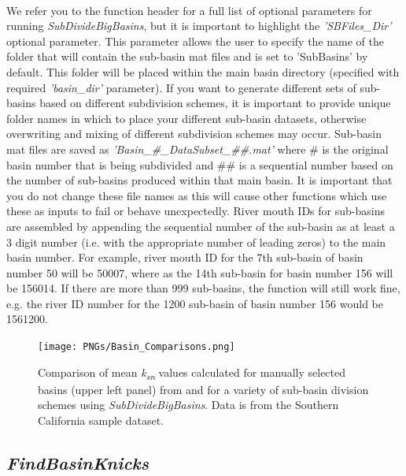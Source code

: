 \paragraph{}We refer you to the function header for a full list of optional parameters for running \textit{SubDivideBigBasins}, but it is important to highlight the \textit{'SBFiles\_Dir'} optional parameter. This parameter allows the user to specify the name of the folder that will contain the sub-basin mat files and is set to 'SubBasins' by default. This folder will be placed within the main basin directory (specified with required \textit{'basin\_dir'} parameter). If you want to generate different sets of sub-basins based on different subdivision schemes, it is important to provide unique folder names in which to place your different sub-basin datasets, otherwise overwriting and mixing of different subdivision schemes may occur. Sub-basin mat files are saved as \textit{'Basin\_\#\_DataSubset\_\#\#.mat'} where \# is the original basin number that is being subdivided and \#\# is a sequential number based on the number of sub-basins produced within that main basin. It is important that you do not change these file names as this will cause other functions which use these as inputs to fail or behave unexpectedly. River mouth IDs for sub-basins are assembled by appending the sequential number of the sub-basin as at least a 3 digit number (i.e. with the appropriate number of leading zeros) to the main basin number. For example, river mouth ID for the 7th sub-basin of basin number 50 will be 50007, where as the 14th sub-basin for basin number 156 will be 156014. If there are more than 999 sub-basins, the function will still work fine, e.g. the river ID number for the 1200 sub-basin of basin number 156 would be 1561200.

\begin{figure}[H]
	\texttt{[image: PNGs/Basin\_Comparisons.png]}
	\caption{Comparison of mean \textit{k\textsubscript{sn}} values calculated for manually selected basins (upper left panel) from  and for a variety of sub-basin division schemes using \textit{SubDivideBigBasins}. Data is from the Southern California sample dataset.}
	\label{fig:BasinsComp}
\end{figure}

\subsection{\textit{FindBasinKnicks}} \label{sec:BsnKncks}
